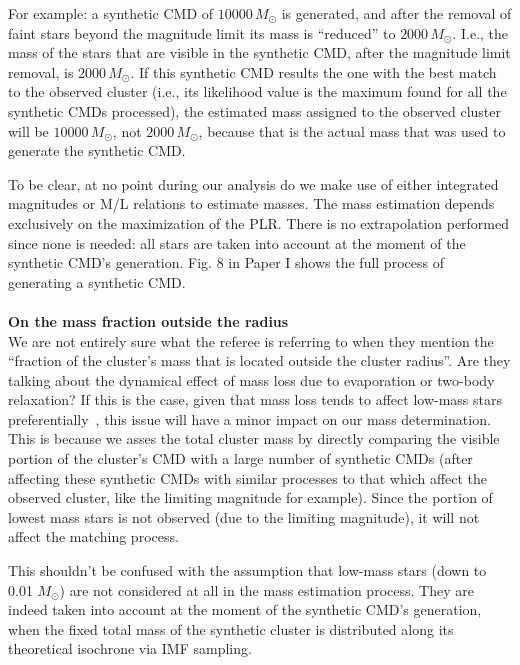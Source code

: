 \documentclass{article}
\begin{document}
For example: a synthetic CMD of $10000\,M_{\odot}$ is generated, and after the
removal of faint stars beyond the magnitude limit its mass is ``reduced'' to
$2000\,M_{\odot}$. I.e., the mass of the stars that are visible in the synthetic
CMD, after the magnitude limit removal, is $2000\,M_{\odot}$.
If this synthetic CMD results the one with the best match to the observed
cluster (i.e., its likelihood value is the maximum found for all the synthetic
CMDs processed), the estimated mass assigned to the observed cluster will be
$10000\,M_{\odot}$, not $2000\,M_{\odot}$, because that is the actual
mass that was used to generate the synthetic CMD.\@

To be clear, at no point during our analysis do we make use of either
integrated magnitudes or M/L relations to estimate masses. The mass estimation
depends exclusively on the maximization of the PLR.\@
There is no extrapolation performed since none is needed: all stars are
taken into account at the moment of the synthetic CMD's generation.
Fig. 8 in Paper I shows the full process of generating a synthetic CMD.\\\\

\noindent \textbf{On the mass fraction outside the radius}\\

We are not entirely sure what the referee is referring to when they mention the
``fraction of the cluster's mass that is located outside the cluster radius''.
Are they talking about the dynamical effect of mass loss due to evaporation or
two-body relaxation?
If this is the case, given that mass loss tends to affect low-mass
stars preferentially~\citep{Vesperini_2010}, this issue will have a minor impact
on our mass determination. This is because we asses the total cluster mass by
directly comparing the visible portion of the cluster's CMD with a large number
of synthetic CMDs (after affecting these synthetic CMDs with similar processes
to  that which affect the observed cluster, like the limiting magnitude for
example). Since the portion of lowest mass stars is not observed (due to the
limiting magnitude), it will not affect the matching process.

This shouldn't be confused with the assumption that low-mass stars (down to
0.01 $M_{\odot}$) are not considered at all in the mass estimation process. They
are indeed taken into account at the moment of the synthetic CMD's generation,
when the fixed total mass of the synthetic cluster is distributed along its
theoretical isochrone via IMF sampling.\\
\end{document}
